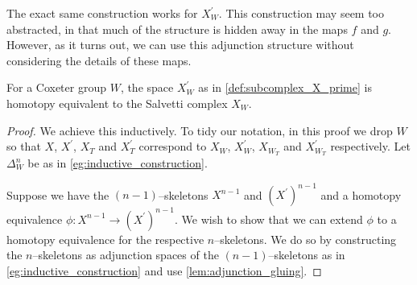 \documentclass[class=article, crop=false]{standalone}
\begin{document}
The exact same construction works for $X^\prime_W$. This construction may seem too abstracted, in that much of the structure is hidden away in the maps $f$ and $g$. However, as it turns out, we can use this adjunction structure without considering the details of these maps.

\begin{theorem}
    \label{thm:salvetti_cx_equiv_X_prime}
    For a Coxeter group $W$, the space $X^\prime_W$ as in \cref{def:subcomplex_X_prime} is homotopy equivalent to the Salvetti complex $X_W$. 
\end{theorem}
\begin{proof}
    We achieve this inductively. To tidy our notation, in this proof we drop $W$ so that $X$, $X^\prime$, $X_T$ and $X^\prime_T$ correspond to $X_W$, $X^\prime_W$, $X_{W_T}$ and $X^\prime_{W_T}$ respectively. Let $\Delta_W^n$ be as in \cref{eg:inductive_construction}.
    
    Suppose we have the $(n-1)$--skeletons $X^{n-1}$ and $(X^\prime)^{n-1}$ and a homotopy equivalence $\phi \colon X^{n-1} \to (X^\prime)^{n-1}$.
    We wish to show that we can extend $\phi$ to a homotopy equivalence for the respective $n$--skeletons. We do so by constructing the $n$--skeletons as adjunction spaces of the $(n-1)$--skeletons as in \cref{eg:inductive_construction} and use \cref{lem:adjunction_gluing}.


\end{proof}
\end{document}
